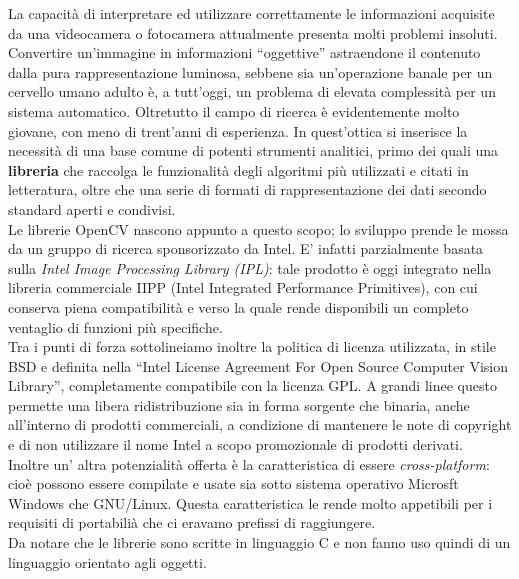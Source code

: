 La capacità di interpretare ed utilizzare correttamente le informazioni acquisite da una videocamera o fotocamera attualmente presenta molti problemi insoluti. Convertire un’immagine in informazioni “oggettive” astraendone il contenuto dalla pura rappresentazione luminosa, sebbene sia un’operazione banale per un cervello umano adulto è, a tutt’oggi, un problema di elevata complessità per un sistema automatico.
Oltretutto il campo di ricerca è evidentemente molto giovane, con meno di trent’anni di esperienza. In quest’ottica si inserisce la necessità di una base comune di potenti strumenti analitici, primo dei quali una \textbf{libreria} che raccolga le funzionalità degli algoritmi più utilizzati e citati in letteratura, oltre che una serie di formati di rappresentazione dei dati secondo standard aperti e condivisi.\\

Le librerie OpenCV  nascono appunto a questo scopo; lo sviluppo prende le mossa da un gruppo di ricerca sponsorizzato da Intel. E’ infatti parzialmente basata sulla \textit{Intel Image Processing Library (IPL)}: tale prodotto è oggi integrato nella libreria commerciale IIPP (Intel Integrated Performance Primitives), con cui conserva piena compatibilità e verso la quale rende disponibili un completo ventaglio di funzioni più specifiche.\\

Tra i punti di forza sottolineiamo inoltre la politica di licenza utilizzata, in stile BSD e definita nella ``Intel License Agreement For Open Source Computer Vision Library'', completamente compatibile con la licenza GPL. A grandi linee questo permette una libera ridistribuzione sia in forma sorgente che binaria, anche all’interno di prodotti commerciali, a condizione di mantenere le note di copyright e di non utilizzare il nome Intel a scopo promozionale di prodotti derivati.\\

Inoltre un' altra potenzialità offerta è la caratteristica di essere \textit{cross-platform}: cioè possono essere compilate e usate sia sotto sistema operativo Microsft Windows che GNU/Linux. Questa caratteristica le rende molto appetibili per i requisiti di portabilià che ci eravamo prefissi di raggiungere.\\ Da notare che le librerie sono scritte in linguaggio C e non fanno uso quindi di un linguaggio orientato agli oggetti.

